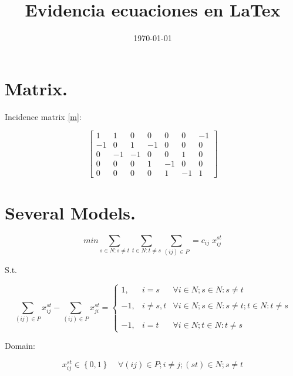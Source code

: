 \documentclass{article}
\title{Evidencia ecuaciones en LaTex}
\author{Cristóbal Galleguillos Ketterer^{1}$\\
\small{$^{1}$Industrial PhD Program}\\
\small{Pontificia Universidad Católica de Valparaíso}\\
\small{cristobal.galleguillos@pucv.cl}}
\date{\small{\today}}
\begin{document}
\maketitle

\section{Matrix.}
Incidence matrix \ref{m}:

\begin{equation}
    \begin{bmatrix}
     1 & 1 & 0 & 0 & 0 & 0 & -1\\
    -1 & 0 & 1 & -1 & 0 & 0 & 0\\
    0 & -1 & -1 & 0 & 0 & 1 & 0\\
    0 & 0 & 0 & 1 & -1 & 0 & 0\\
    0 & 0 & 0 & 0 & 1 & -1 & 1
\label{m}
\end{bmatrix}
\end{equation}


\section{Several Models.}

\begin{equation}
min\sum_{s\in N:s\not= t}\sum_{t\in N:t\not= s}\sum_{(ij)\in P}=c_{ij}\;x_{ij}^{st} 
\label{min}
\end{equation}

S.t.

\begin{equation}
\sum_{(ij)\in P}x_{ij}^{st} -\sum_{(ij)\in P}x_{ji}^{st} = \left\{ \begin{array}{lcc}
             1,     &   i=s     &            \forall i\in N;s\in N:s\not=t\\
             \\ -1, & i\not=s,t &            \forall i\in N;s\in N:s\not=t;t\in N:t\not=s\\\\
             \\ -1, &  i=t      &           \forall i\in N;t\in N:t\not=s    
             \end{array} \label{st}
   \right. 
\end{equation}

Domain:

\begin{equation}
x_{ij}^{st}\in \left\lbrace0,1\right\rbrace\;\;\;\;\forall (ij)\in P;i\not=j;(st)\in N;s\not=t \label{bin}
\end{equation}
\end{document}
